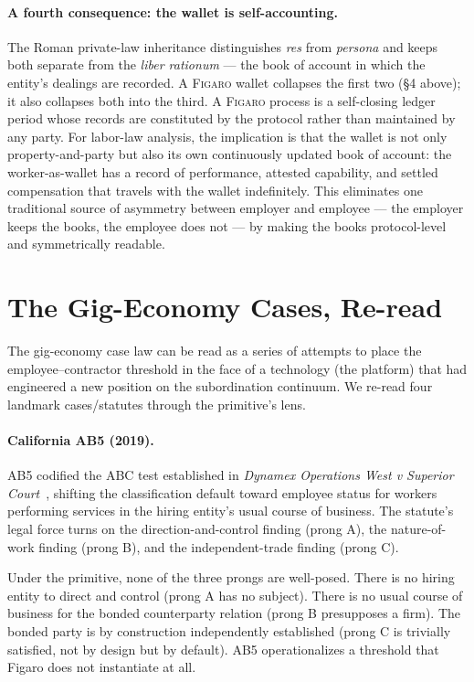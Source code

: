 \documentclass[11pt,a4paper]{article}
\theoremstyle{remark}
\newcommand{\figaro}{\textsc{Figaro}}
\begin{document}
\paragraph{A fourth consequence: the wallet is self-accounting.}
The Roman private-law inheritance distinguishes \emph{res}
from \emph{persona} and keeps both separate from the
\emph{liber rationum} --- the book of account in which the
entity's dealings are recorded. A \figaro{} wallet collapses
the first two (§4 above); it also collapses both into the
third. A \figaro{} process is a self-closing ledger period
whose records are constituted by the protocol rather than
maintained by any party. For labor-law analysis, the
implication is that the wallet is not only property-and-party
but also its own continuously updated book of account: the
worker-as-wallet has a record of performance, attested
capability, and settled compensation that travels with the
wallet indefinitely. This eliminates one traditional source
of asymmetry between employer and employee --- the employer
keeps the books, the employee does not --- by making the
books protocol-level and symmetrically readable.

\section{The Gig-Economy Cases, Re-read}
\label{sec:gig}

The gig-economy case law can be read as a series of attempts to
place the employee--contractor threshold in the face of a
technology (the platform) that had engineered a new position on the
subordination continuum. We re-read four landmark cases/statutes
through the primitive's lens.

\paragraph{California AB5 (2019).}
AB5 codified the ABC test established in \emph{Dynamex Operations
West v Superior Court}~\citep{dynamex_2018}, shifting the
classification default toward employee status for workers
performing services in the hiring entity's usual course of
business. The statute's legal force turns on the direction-and-control
finding (prong A), the nature-of-work finding (prong B), and the
independent-trade finding (prong C).

Under the primitive, none of the three prongs are well-posed. There
is no hiring entity to direct and control (prong A has no subject).
There is no usual course of business for the bonded counterparty
relation (prong B presupposes a firm). The bonded party is by
construction independently established (prong C is trivially
satisfied, not by design but by default). AB5 operationalizes a
threshold that Figaro does not instantiate at all.
\end{document}
